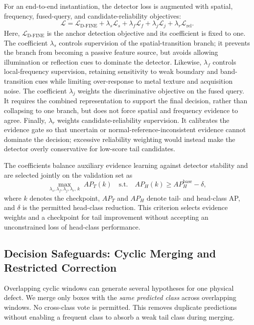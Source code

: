 For an end-to-end instantiation, the detector loss is augmented with spatial, frequency, fused-query, and candidate-reliability objectives:
\begin{equation}
\mathcal L=\mathcal L_{\mathrm{D\text{-}FINE}}+\lambda_s\mathcal L_s+\lambda_f\mathcal L_f+\lambda_j\mathcal L_j+\lambda_r\mathcal L_{\mathrm{rel}}.
\label{eq:loss}
\end{equation}
Here, $\mathcal L_{\mathrm{D\text{-}FINE}}$ is the anchor detection objective and its coefficient is fixed to one. The coefficient $\lambda_s$ controls supervision of the spatial-transition branch; it prevents the branch from becoming a passive feature source, but avoids allowing illumination or reflection cues to dominate the detector. Likewise, $\lambda_f$ controls local-frequency supervision, retaining sensitivity to weak boundary and band-transition cues while limiting over-response to metal texture and acquisition noise. The coefficient $\lambda_j$ weights the discriminative objective on the fused query. It requires the combined representation to support the final decision, rather than collapsing to one branch, but does not force spatial and frequency evidence to agree. Finally, $\lambda_r$ weights candidate-reliability supervision. It calibrates the evidence gate so that uncertain or normal-reference-inconsistent evidence cannot dominate the decision; excessive reliability weighting would instead make the detector overly conservative for low-score tail candidates.

The coefficients balance auxiliary evidence learning against detector stability and are selected jointly on the validation set as
\begin{equation}
\max_{\lambda_s,\lambda_f,\lambda_j,\lambda_r,\,k}\; AP_T(k)
\quad\text{s.t.}\quad
AP_H(k)\geq AP_H^{\mathrm{base}}-\delta,
\label{eq:weight-selection}
\end{equation}
where $k$ denotes the checkpoint, $AP_T$ and $AP_H$ denote tail- and head-class AP, and $\delta$ is the permitted head-class reduction. This criterion selects evidence weights and a checkpoint for tail improvement without accepting an unconstrained loss of head-class performance.

\subsection{Decision Safeguards: Cyclic Merging and Restricted Correction}

Overlapping cyclic windows can generate several hypotheses for one physical defect. We merge only boxes with the \emph{same predicted class} across overlapping windows. No cross-class vote is permitted. This removes duplicate predictions without enabling a frequent class to absorb a weak tail class during merging.

